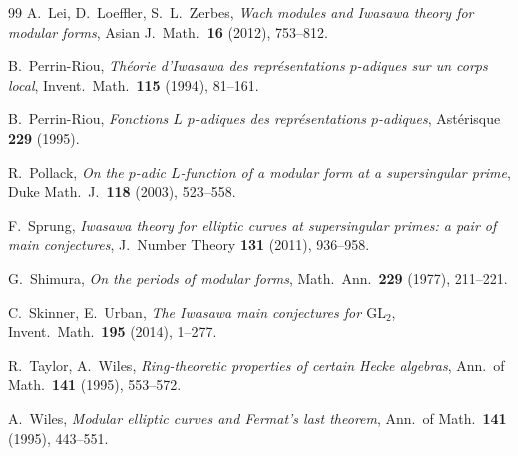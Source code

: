 \documentclass[12pt,reqno]{amsart}
\theoremstyle{definition}
\theoremstyle{remark}
\begin{document}
\begin{thebibliography}{99}
A.~Lei, D.~Loeffler, S.~L.~Zerbes, \emph{Wach modules and Iwasawa theory for modular forms}, Asian J.\ Math.\ \textbf{16} (2012), 753--812.

B.~Perrin-Riou, \emph{Th\'eorie d'Iwasawa des repr\'esentations $p$-adiques sur un corps local}, Invent.\ Math.\ \textbf{115} (1994), 81--161.

B.~Perrin-Riou, \emph{Fonctions $L$ $p$-adiques des repr\'esentations $p$-adiques}, Ast\'erisque \textbf{229} (1995).

R.~Pollack, \emph{On the $p$-adic $L$-function of a modular form at a supersingular prime}, Duke Math.\ J.\ \textbf{118} (2003), 523--558.

F.~Sprung, \emph{Iwasawa theory for elliptic curves at supersingular primes: a pair of main conjectures}, J.~Number Theory \textbf{131} (2011), 936--958.

G.~Shimura, \emph{On the periods of modular forms}, Math.\ Ann.\ \textbf{229} (1977), 211--221.

C.~Skinner, E.~Urban, \emph{The Iwasawa main conjectures for $\mathrm{GL}_2$}, Invent.\ Math.\ \textbf{195} (2014), 1--277.

R.~Taylor, A.~Wiles, \emph{Ring-theoretic properties of certain Hecke algebras}, Ann.\ of Math.\ \textbf{141} (1995), 553--572.

A.~Wiles, \emph{Modular elliptic curves and Fermat's last theorem}, Ann.\ of Math.\ \textbf{141} (1995), 443--551.
\end{thebibliography}
\end{document}
